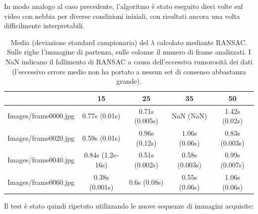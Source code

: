\documentclass[12pt]{report}
\begin{document}
\noindent In modo analogo al caso precedente, l'algoritmo \`e stato eseguito dieci volte sul video con nebbia per diverse condizioni iniziali, con risultati ancora una volta difficilmente interpretabili.

\begin{table}[H]
\begin{center}
\begin{tabular}{|c|c|c|c|c|}
	\hline
	& 15 & 25 & 35 & 50 \\ \hline
	Images/frame0000.jpg & 0.77s (0.01s) & 0.71s (0.005s) & NaN (NaN) & 1.42s (0.02s)\\ \hline
	Images/frame0020.jpg & 0.59s (0.01s) & 0.96s (0.12s) & 1.06s (0.06s) & 0.83s (0.003s)\\ \hline
	Images/frame0040.jpg & 0.84s (1.2e-16s) & 0.51s (0.002s) & 0.58s (0.003s) & 0.99s (0.007s)\\ \hline
	Images/frame0060.jpg & 0.38s (0.001s) & 0.6s (0.08s) & 0.55s (0.06s) & 1.06s (0.06s)\\ \hline
\end{tabular}
\caption{Media (deviazione standard campionaria) del $\lambda$ calcolato mediante RANSAC. Sulle righe l'immagine di partenza, sulle colonne il numero di frame analizzati. I NaN indicano il fallimento di RANSAC a causa dell'eccessiva rumorosit\`a dei dati (l'eccessivo errore medio non ha portato a nessun set di consenso abbastanza grande).}
\label{tabRans}
\end{center}
\end{table}

\noindent Il test \`e stato quindi ripetuto utilizzando le nuove sequenze di immagini acquisite:
\end{document}
